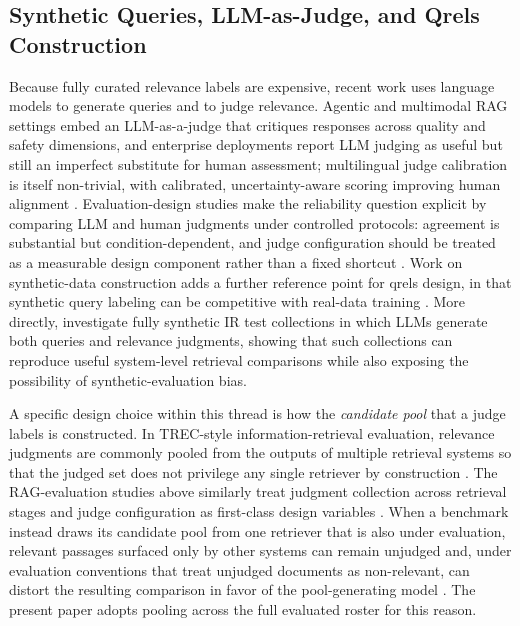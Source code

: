 \subsection{Synthetic Queries, LLM-as-Judge, and Qrels Construction}\label{rw-qrels}

Because fully curated relevance labels are expensive, recent work uses language models to generate queries and to judge relevance. Agentic and multimodal RAG settings embed an LLM-as-a-judge that critiques responses across quality and safety dimensions, and enterprise deployments report LLM judging as useful but still an imperfect substitute for human assessment; multilingual judge calibration is itself non-trivial, with calibrated, uncertainty-aware scoring improving human alignment \citep{Bellard_2025, Wang_Birman_2025, Kunuku_2025, Taemkaeo_2026, Wen_2026}. Evaluation-design studies make the reliability question explicit by comparing LLM and human judgments under controlled protocols: agreement is substantial but condition-dependent, and judge configuration should be treated as a measurable design component rather than a fixed shortcut \citep{thakur2025support, abdallah2025rerankarena, miyaji2025evaluating}. Work on synthetic-data construction adds a further reference point for qrels design, in that synthetic query labeling can be competitive with real-data training \citep{Bassani_2021}. More directly, \citet{Rahmani_Synthetic_2024} investigate fully synthetic IR test collections in which LLMs generate both queries and relevance judgments, showing that such collections can reproduce useful system-level retrieval comparisons while also exposing the possibility of synthetic-evaluation bias.

A specific design choice within this thread is how the \emph{candidate pool} that a judge labels is constructed. In TREC-style information-retrieval evaluation, relevance judgments are commonly pooled from the outputs of multiple retrieval systems so that the judged set does not privilege any single retriever by construction \citep{Voorhees_Evaluation_2002}. The RAG-evaluation studies above similarly treat judgment collection across retrieval stages and judge configuration as first-class design variables \citep{thakur2025support, abdallah2025rerankarena, miyaji2025evaluating}. When a benchmark instead draws its candidate pool from one retriever that is also under evaluation, relevant passages surfaced only by other systems can remain unjudged and, under evaluation conventions that treat unjudged documents as non-relevant, can distort the resulting comparison in favor of the pool-generating model \citep{zobel1998reliable, buckley2004retrieval}. The present paper adopts pooling across the full evaluated roster for this reason.

